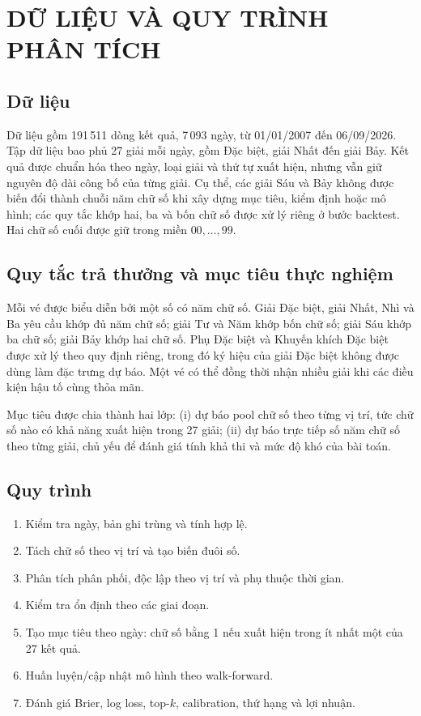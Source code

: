 \chapter{DỮ LIỆU VÀ QUY TRÌNH PHÂN TÍCH}
\section{Dữ liệu}
Dữ liệu gồm 191\,511 dòng kết quả, 7\,093 ngày, từ 01/01/2007 đến 06/09/2026. Tập dữ liệu bao phủ 27 giải mỗi ngày, gồm Đặc biệt, giải Nhất đến giải Bảy. Kết quả được chuẩn hóa theo ngày, loại giải và thứ tự xuất hiện, nhưng vẫn giữ nguyên độ dài công bố của từng giải. Cụ thể, các giải Sáu và Bảy không được biến đổi thành chuỗi năm chữ số khi xây dựng mục tiêu, kiểm định hoặc mô hình; các quy tắc khớp hai, ba và bốn chữ số được xử lý riêng ở bước backtest. Hai chữ số cuối được giữ trong miền $00,\ldots,99$.

\section{Quy tắc trả thưởng và mục tiêu thực nghiệm}
Mỗi vé được biểu diễn bởi một số có năm chữ số. Giải Đặc biệt, giải Nhất, Nhì và Ba yêu cầu khớp đủ năm chữ số; giải Tư và Năm khớp bốn chữ số; giải Sáu khớp ba chữ số; giải Bảy khớp hai chữ số. Phụ Đặc biệt và Khuyến khích Đặc biệt được xử lý theo quy định riêng, trong đó ký hiệu của giải Đặc biệt không được dùng làm đặc trưng dự báo. Một vé có thể đồng thời nhận nhiều giải khi các điều kiện hậu tố cùng thỏa mãn.

Mục tiêu được chia thành hai lớp: (i) dự báo pool chữ số theo từng vị trí, tức chữ số nào có khả năng xuất hiện trong 27 giải; (ii) dự báo trực tiếp số năm chữ số theo từng giải, chủ yếu để đánh giá tính khả thi và mức độ khó của bài toán.

\section{Quy trình}
\begin{enumerate}
	\item Kiểm tra ngày, bản ghi trùng và tính hợp lệ.
	\item Tách chữ số theo vị trí và tạo biến đuôi số.
	\item Phân tích phân phối, độc lập theo vị trí và phụ thuộc thời gian.
	\item Kiểm tra ổn định theo các giai đoạn.
	\item Tạo mục tiêu theo ngày: chữ số bằng 1 nếu xuất hiện trong ít nhất một của 27 kết quả.
	\item Huấn luyện/cập nhật mô hình theo walk-forward.
	\item Đánh giá Brier, log loss, top-$k$, calibration, thứ hạng và lợi nhuận.
\end{enumerate}

